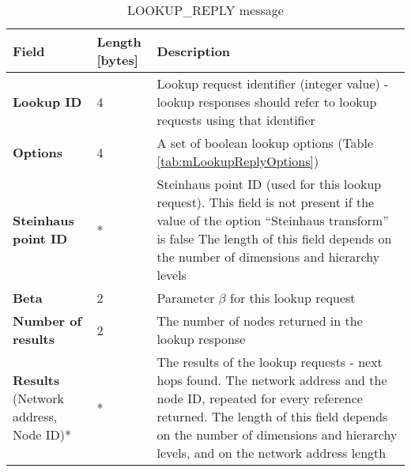 \begin{table}[H]
\scriptsize
\begin{center}
\begin{tabular}{p{3.3cm} p{1.7cm} p{9.5cm}}
	\hline
	\textbf{Field}						& \textbf{Length} [bytes]				& \textbf{Description}				\\[1mm]
    \hline
    \textbf{Lookup ID}					& 4										& Lookup request identifier (integer value) - lookup responses should refer to lookup requests using that identifier					\\[1.5mm]
	\textbf{Options}					& 4										& A set of boolean lookup options (Table \ref{tab:mLookupReplyOptions})				\\[1.5mm]
	\textbf{Steinhaus point ID} \newline [optional]		& *						& Steinhaus point ID (used for this lookup request). This field is not present if the value of the option ``Steinhaus transform'' is false \newline * The length of this field depends on the number of dimensions and hierarchy levels					\\[1.5mm]	
	\textbf{Beta}						& 2										& Parameter $\beta$ for this lookup request					\\[1.5mm]
	\textbf{Number of results}			& 2										& The number of nodes returned in the lookup response		\\[1.5mm]
	\textbf{Results} \newline (Network address, Node ID)*			& *			& The results of the lookup requests - next hops found. The network address and the node ID, repeated for every reference returned. \newline * The length of this field depends on the number of dimensions and hierarchy levels, and on the network address length		\\[1.5mm]
    \hline
\end{tabular}
\end{center}
\caption{LOOKUP\_REPLY message}
\label{tab:mLookupReply}
\end{table}

